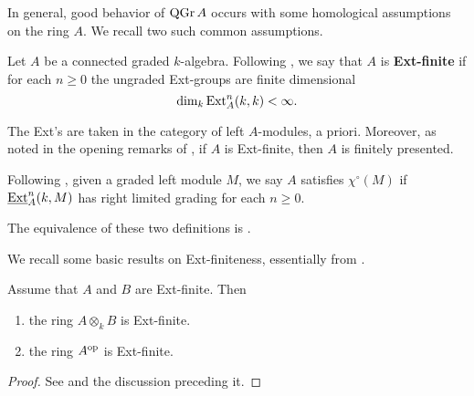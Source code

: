 In general, good behavior of \(\operatorname{QGr}A\) occurs with some homological assumptions on the ring \(A\). We recall two such common assumptions. 

\begin{definition} \label{definition: Ext-finite}
  Let \(A\) be a connected graded \(k\)-algebra. Following \textcite{VdB}, we say that \(A\) is \textbf{Ext-finite} if for each \(n \geq 0\) the ungraded Ext-groups are finite dimensional 
  \begin{displaymath}
    \operatorname{dim}_k \operatorname{Ext}_A^n (k,k) < \infty.
  \end{displaymath}
\end{definition}

\begin{remark}
  The Ext's are taken in the category of left \(A\)-modules, a priori.
  Moreover, as noted in the opening remarks of \textcite[Section 4.1]{BVdB}, if \(A\) is Ext-finite, then \(A\) is finitely presented.
\end{remark}

\begin{definition} \label{definition: chi}
  Following \textcite{AZ94}, given a graded left module \(M\), we say \(A\) satisfies \(\chi^\circ(M)\) if \(\underline{\operatorname{Ext}}^n_A(k,M)\) has right limited grading for each \(n \geq 0\). 

\end{definition}

\begin{remark}
  The equivalence of these two definitions is \textcite[Proposition 3.8 (1)]{AZ94}.
\end{remark}

We recall some basic results on Ext-finiteness, essentially from \textcite[Section 4]{VdB}.

\begin{proposition} \label{proposition: tensor and op properties of ext-finite}
  Assume that \(A\) and \(B\) are Ext-finite. Then
  \begin{enumerate}
  \item the ring \(A \otimes_k B\) is Ext-finite. 
  \item the ring \(A^{\operatorname{op}}\) is Ext-finite.
  \end{enumerate}
\end{proposition}

\begin{proof}
  See \textcite[Lemma 4.2]{VdB} and the discussion preceding it. 
\end{proof}

